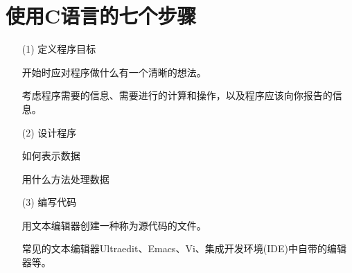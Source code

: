\section{使用C语言的七个步骤}


\begin{frame}\ft{\secname}
  
  \begin{itemize}
  \item[(1)] 定义程序目标\\[0.1in]
  \item[] 开始时应对程序做什么有一个清晰的想法。\\[0.1in]
  \item[] 考虑程序需要的信息、需要进行的计算和操作，以及程序应该向你报告的信息。
  \end{itemize}
  
\end{frame}


\begin{frame}\ft{\secname}
  
  \begin{itemize}
  \item[(2)] 设计程序\\[0.1in]
  \item[] 如何表示数据   \\[0.1in]
  \item[] 用什么方法处理数据  \\[0.1in]
  \item[] 
  \end{itemize}

\end{frame}


\begin{frame}\ft{\secname}
  
  \begin{itemize}
  \item[(3)] 编写代码\\[0.1in]
  \item[] 用文本编辑器创建一种称为源代码的文件。
  \item[] 常见的文本编辑器Ultraedit、Emacs、Vi、集成开发环境(IDE)中自带的编辑器等。
  \end{itemize}
  
\end{frame}


